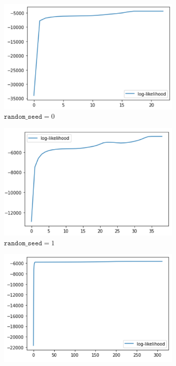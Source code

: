 \documentclass[11pt]{article}
\begin{document}
\begin{figure}[H]
    \begin{subfigure}[H]{0.5\textwidth}
        \includegraphics[width=1\linewidth]{img/plot_0.PNG}
        \caption{$\texttt{random\_seed}=0$}\vspace{2mm}
    \end{subfigure}
    \begin{subfigure}[H]{0.5\textwidth}
        \includegraphics[width=1\linewidth]{img/plot_1.PNG}
        \caption{$\texttt{random\_seed}=1$}\vspace{2mm}
    \end{subfigure}
    \begin{subfigure}[H]{0.5\textwidth}
        \includegraphics[width=1\linewidth]{img/plot_42.PNG}

\end{subfigure}
\end{figure}
\end{document}

